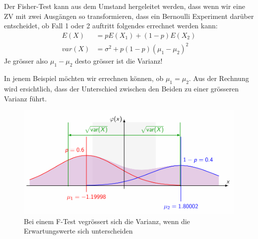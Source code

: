\documentclass[../Main.tex]{subfiles}
\begin{document}
Der Fisher-Test kann aus dem Umstand hergeleitet werden,
dass wenn wir eine ZV mit zwei Ausgängen so transformieren,
dass ein Bernoulli Experiment darüber entscheidet, ob Fall 1 oder 2 auftritt folgendes
errechnet werden kann:
\begin{equation*}
    \begin{split}
        E(X) &= p E(X_1) + (1-p) E(X_2) \\
        var(X) &= \sigma^2 + p(1-p)(\mu_1 - \mu_2)^2
    \end{split}
\end{equation*}
Je grösser also \(\mu_1 - \mu_2\) desto grösser ist die Varianz!

In jenem Beispiel möchten wir errechnen können, ob \(\mu_1 = \mu_2\).
Aus der Rechnung wird ersichtlich, dass der Unterschied zwischen den Beiden zu einer grösseren Varianz führt.

\begin{figure}[H]
    \centering
    \includegraphics[width=0.75\linewidth]{Images/f-test-verteilung.png}
    \caption{Bei einem F-Test vegrössert sich die Varianz, wenn die Erwartungswerte sich unterscheiden}
\end{figure}
\end{document}
